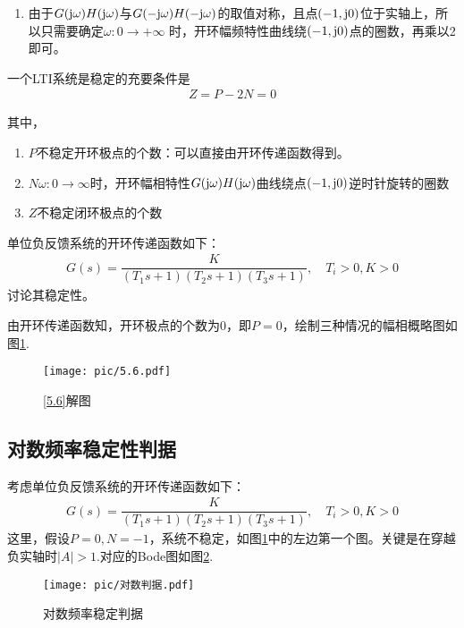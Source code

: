 \begin{enumerate}[1.]
\begin{enumerate}[(1) ]
		\item 由于$G(\text{j} \omega)H(\text{j} \omega)$与$G(- \text{j} \omega) H(- \text{j} \omega)$的取值对称，且点$(-1, \text{j} 0)$位于实轴上，所以只需要确定$\omega : 0 \to +\infty $ 时，开环幅频特性曲线绕$(-1, \text{j} 0)$点的圈数，再乘以2即可。
	\end{enumerate}

	\theorem[Nyquist稳定判据]
	一个LTI系统是稳定的充要条件是
	\begin{align}
	Z = P - 2 N = 0
	\end{align}
	\vspace*{-3.5em}
	
	其中，\vspace*{-0.5em}
	\begin{enumerate}[\hspace*{2em}]
		\item $P$\quad 不稳定开环极点的个数：可以直接由开环传递函数得到。
	
		\item $N$\quad $\omega : 0 \to \infty$时，开环幅相特性$G(\text{j} \omega)H(\text{j} \omega)$曲线绕点$(-1, \text{j} 0)$逆时针旋转的圈数
		
		\item $Z$\quad 不稳定闭环极点的个数
	\end{enumerate}
	
	\examples \label{5.6}单位负反馈系统的开环传递函数如下：
	\begin{align*}
		G(s) = \dfrac{K}{(T_1s+1)(T_2s+1)(T_3s+1)}, \quad T_i > 0, K>0
	\end{align*}
	讨论其稳定性。
	\vspace*{-0.5em}
	
	\solve 由开环传递函数知，开环极点的个数为0，即$P=0$，绘制三种情况的幅相概略图如图\ref{F5.6}.
	
	\begin{figure}[!htb]
		\centering
		\texttt{[image: pic/5.6.pdf]}
		\caption{\ref{5.6}解图}
		\label{F5.6}
	\end{figure}
\end{enumerate}

\subsection{对数频率稳定性判据}
考虑单位负反馈系统的开环传递函数如下：
\begin{align*}
	G(s) = \dfrac{K}{(T_1s+1)(T_2s+1)(T_3s+1)}, \quad T_i > 0, K>0
\end{align*}
这里，假设$P=0,N=-1$，系统不稳定，如图\ref{F5.6}中的左边第一个图。关键是在穿越负实轴时$|A|>1$.对应的Bode图如图\ref{对数稳定}.
\begin{figure}[!htb]
	\centering
	\texttt{[image: pic/对数判据.pdf]}
	\caption{对数频率稳定判据}
	\label{对数稳定}
\end{figure}

